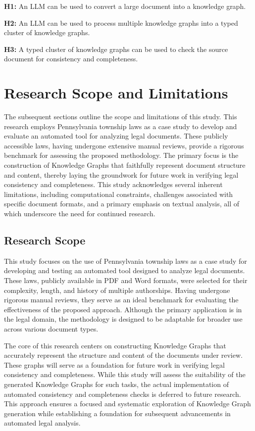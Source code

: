 \textbf{H1:} An LLM can be used to convert a large document into a knowledge graph.\par

\textbf{H2:} An LLM can be used to process multiple knowledge graphs into a typed cluster of knowledge graphs.\par

\textbf{H3:} A typed cluster of knowledge graphs can be used to check the source document for consistency and completeness.\par

\section{Research Scope and Limitations}
The subsequent sections outline the scope and limitations of this study. This research employs Pennsylvania township laws as a case study to develop and evaluate an automated tool for analyzing legal documents. These publicly accessible laws, having undergone extensive manual reviews, provide a rigorous benchmark for assessing the proposed methodology. The primary focus is the construction of Knowledge Graphs that faithfully represent document structure and content, thereby laying the groundwork for future work in verifying legal consistency and completeness. This study acknowledges several inherent limitations, including computational constraints, challenges associated with specific document formats, and a primary emphasis on textual analysis, all of which underscore the need for continued research.
\subsection{Research Scope}

This study focuses on the use of Pennsylvania township laws as a case study for developing and testing an automated tool designed to analyze legal documents. These laws, publicly available in PDF and Word formats, were selected for their complexity, length, and history of multiple authorships. Having undergone rigorous manual reviews, they serve as an ideal benchmark for evaluating the effectiveness of the proposed approach. Although the primary application is in the legal domain, the methodology is designed to be adaptable for broader use across various document types.

The core of this research centers on constructing Knowledge Graphs that accurately represent the structure and content of the documents under review. These graphs will serve as a foundation for future work in verifying legal consistency and completeness. While this study will assess the suitability of the generated Knowledge Graphs for such tasks, the actual implementation of automated consistency and completeness checks is deferred to future research. This approach ensures a focused and systematic exploration of Knowledge Graph generation while establishing a foundation for subsequent advancements in automated legal analysis.

